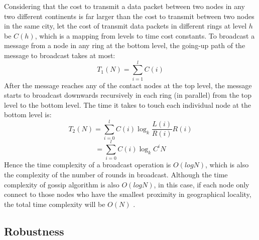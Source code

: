 Considering that the cost to transmit a data packet between two nodes in any two different continents is far larger than the cost to transmit between two nodes in the same city, let the cost of transmit data packets in different rings at level $h$ be $C(h)$, which is a mapping from levels to time cost constants. 
To broadcast a message from a node in any ring at the bottom level, the going-up path of the message to broadcast takes at most: $$T_1(N) = \sum_{i=1}^{l}C(i)$$
After the message reaches any of the contact nodes at the top level, the message starts to broadcast downwards recursively in each ring (in parallel) from the top level to the bottom level. The time it takes to touch each individual node at the bottom level is: $$T_2(N) = \sum_{i=0}^{l}C(i)\log_{k}{\frac{L(i)}{R(i)}}R(i)$$ $$= \sum_{i=0}^{l}C(i)\log_{k}{C^iN}$$
Hence the time complexity of a broadcast operation is $O(logN)$, which is also the complexity of the number of rounds in broadcast. Although the time complexity of gossip algorithm is also $O(logN)$, in this case, if each node only connect to those nodes who have the smallest proximity in geographical locality, the total time complexity will be $O(N)$ \cite{kashyap2006efficient, kaune2008embracing}.

\subsection{Robustness}

